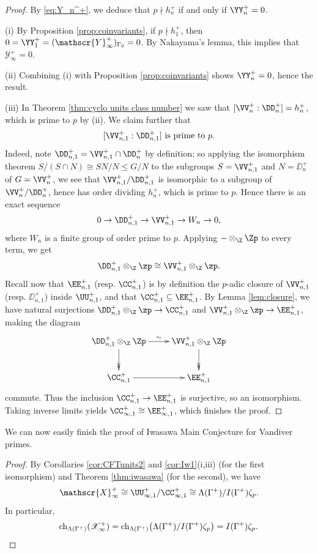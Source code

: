 \documentclass[a4paper,10pt, english, reqno]{smfart}
\newcommand{\GG}{\Gamma}
\numberwithin{equation}{section}
\begin{document}
\begin{proof}
By \eqref{eq:Y_n^+}, we deduce that $p \nmid h_n^+$ if and only if $\YY_n^+ = 0$. %

(i)  By Proposition \ref{prop:coinvariants}, if $p \nmid h_1^+$, then $0 = \YY_1^+ = (\mathscr{Y}_\infty^+)_{\GG_0} = 0$. By Nakayama's lemma, this implies that $\mathscr{Y}_\infty^+ = 0$. 

(ii) Combining (i) with Proposition \ref{prop:coinvariants} shows $\YY_n^+ = 0$, hence the result.

(iii) In Theorem \ref{thm:cyclo units class number} we saw that $[\VV_n^+:\DD_n^+] = h_n^+$, which is prime to $p$ by (ii). We claim further that  
\begin{equation}\label{eq:prime to p}
    [\VV_{n,1}^+ : \DD_{n,1}^+] \text{ is prime to }p.
\end{equation}
Indeed,  note $\DD_{n,1}^+ = \VV_{n,1}^+ \cap \DD_{n}^+$ by definition; so applying the isomorphism theorem $S/(S\cap N) \cong SN/N \leq G/N$ to the subgroups $S = \VV_{n,1}^+$ and $N = \DD_n^+$ of $G = \VV_n^+$, we see that $\VV_{n,1}^+/\DD_{n,1}^+$ is isomorphic to a subgroup of $\VV_n^+/\DD_n^+$, hence has order dividing $h_n^+$, which is prime to $p$.  Hence there is an exact sequence
\[ 0 \to \DD^+_{n, 1} \to \VV^+_{n, 1} \to W_n \to 0, \]
where $W_n$ is a finite group of order prime to $p$. Applying $-\otimes_{\Z}\Zp$ to every term, we get
\[ \DD^+_{n, 1} \otimes_\Z \zp \cong \VV^+_{n, 1} \otimes_\Z \zp. \]
Recall now that $\EE^+_{n, 1}$ (resp. $\CC^+_{n, 1}$) is by definition the $p$-adic closure of $\VV^+_{n, 1}$ (resp. $\DD^+_{n, 1}$) inside $\UU^+_{n, 1}$, and that $\CC^+_{n, 1} \subseteq \EE^+_{n, 1}$. By Lemma \ref{lem:closure}, we have natural surjections $\DD^+_{n, 1} \otimes_{\Z} \zp \to \CC^+_{n, 1}$ and $\VV^+_{n, 1} \otimes_{\Z} \zp \to \EE^+_{n, 1}$, making the diagram
\[
\xymatrix{
\DD_{n,1}^+ \otimes_{\Z} \Zp \ar[r]^{\sim}\ar@{->>}[d] & \VV_{n,1}^+\otimes_{\Z} \Zp\ar@{->>}[d]\\
\CC_{n,1}^+ \ar[r] & \EE_{n,1}^+
}
\]
commute. Thus the inclusion $\CC^+_{n, 1} \to \EE^+_{n, 1}$ is surjective, so an isomorphism. Taking inverse limits yields $\CC_{\infty,1}^+ \cong \EE^+_{\infty,1}$, which finishes the proof.
\end{proof}


We can now easily finish the proof of Iwasawa Main Conjecture for Vandiver primes.



\begin{proof}
By Corollaries \ref{cor:CFTunits2} and \ref{cor:Iw1}(i,iii) (for the first isomorphism) and Theorem \ref{thm:iwasawa} (for the second), we have 
\[ \mathscr{X}^+_\infty \cong  \UU^+_{\infty, 1} / \CC^+_{\infty, 1} \cong \Lambda(\GG^+) / I(\GG^+) \zeta_p. \] 
In particular, 
\[ \mathrm{ch}_{\Lambda(\GG^+)}(\mathscr{X}_\infty^+) = \mathrm{ch}_{\Lambda(\GG^+)} \big( \Lambda(\GG^+) / I(\GG^+) \zeta_p \big) = I(\GG^+) \zeta_p.\qedhere \]
\end{proof}
\end{document}
